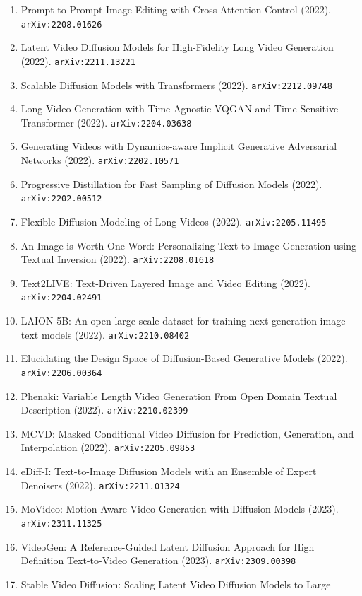 \documentclass[11pt]{article}
\begin{document}
\begin{enumerate}
  Subject-Driven Generation (2022). \texttt{arXiv:2208.12242}
  \item Prompt-to-Prompt Image Editing with Cross Attention Control (2022). \texttt{arXiv:2208.01626}
  \item Latent Video Diffusion Models for High-Fidelity Long Video Generation (2022). \texttt{arXiv:2211.13221}
  \item Scalable Diffusion Models with Transformers (2022). \texttt{arXiv:2212.09748}
  \item Long Video Generation with Time-Agnostic VQGAN and Time-Sensitive
  Transformer (2022). \texttt{arXiv:2204.03638}
  \item Generating Videos with Dynamics-aware Implicit Generative Adversarial
  Networks (2022). \texttt{arXiv:2202.10571}
  \item Progressive Distillation for Fast Sampling of Diffusion Models (2022). \texttt{arXiv:2202.00512}
  \item Flexible Diffusion Modeling of Long Videos (2022). \texttt{arXiv:2205.11495}
  \item An Image is Worth One Word: Personalizing Text-to-Image Generation using
  Textual Inversion (2022). \texttt{arXiv:2208.01618}
  \item Text2LIVE: Text-Driven Layered Image and Video Editing (2022). \texttt{arXiv:2204.02491}
  \item LAION-5B: An open large-scale dataset for training next generation
  image-text models (2022). \texttt{arXiv:2210.08402}
  \item Elucidating the Design Space of Diffusion-Based Generative Models (2022). \texttt{arXiv:2206.00364}
  \item Phenaki: Variable Length Video Generation From Open Domain Textual
  Description (2022). \texttt{arXiv:2210.02399}
  \item MCVD: Masked Conditional Video Diffusion for Prediction, Generation, and
  Interpolation (2022). \texttt{arXiv:2205.09853}
  \item eDiff-I: Text-to-Image Diffusion Models with an Ensemble of Expert
  Denoisers (2022). \texttt{arXiv:2211.01324}
  \item MoVideo: Motion-Aware Video Generation with Diffusion Models (2023). \texttt{arXiv:2311.11325}
  \item VideoGen: A Reference-Guided Latent Diffusion Approach for High
  Definition Text-to-Video Generation (2023). \texttt{arXiv:2309.00398}
  \item Stable Video Diffusion: Scaling Latent Video Diffusion Models to Large

\end{enumerate}
\end{document}
